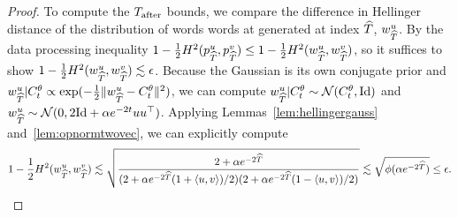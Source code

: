 \begin{proof}
To compute the $T_{\mathrm{after}}$ bounds, we compare the difference in Hellinger distance of the distribution of words words at generated at index $\widehat{T}$, $w^u_{\widehat{T}}$. By the data processing inequality $1-\frac{1}{2}H^2(p^u_{\widehat{T}},p^v_{\widehat{T}}) \leq 1-\frac{1}{2}H^2(w^u_{\widehat{T}},w^v_{\widehat{T}})$, so it suffices to show $1-\frac{1}{2}H^2(w^u_{\widehat{T}},w^v_{\widehat{T}}) \lesssim \epsilon$.  Because the Gaussian is its own conjugate prior and $w^u_{\widehat{T}}|C^\theta_t \propto \exp(-\frac{1}{2}\|w^u_{\widehat{T}}-C^\theta_t\|^2)$, we can compute $w^u_{\widehat{T}} |C^\theta_t  \sim \mathcal{N}(C^\theta_t,\mathrm{Id})$ and $w^u_{\widehat{T}} \sim \mathcal{N}(0,2\mathrm{Id}+\alpha e^{-2t} uu^\top)$. Applying Lemmas~\ref{lem:hellingergauss} and~\ref{lem:opnormtwovec}, we can explicitly compute 
\begin{align*}
1-\frac{1}{2}H^2(w^u_{\widehat{T}},w^v_{\widehat{T}})\lesssim \sqrt{\frac{2+\alpha e^{-2\widehat{T}}}{(2+\alpha e^{-2\widehat{T}} (1+\langle u,v\rangle)/2)(2+\alpha e^{-2\widehat{T}} (1-\langle u,v\rangle)/2)}} \lesssim \sqrt{\phi(\alpha e^{-2\widehat{T}})} \leq \epsilon.
\end{align*}


\end{proof}
